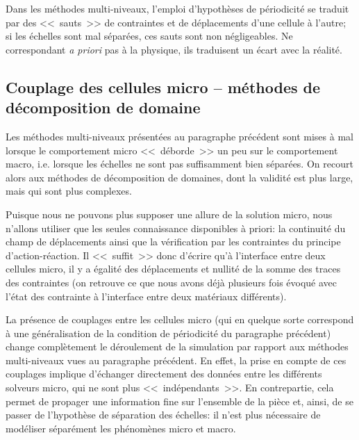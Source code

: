 Dans les méthodes multi-niveaux, l'emploi d'hypothèses de périodicité se traduit par
des <<~sauts~>> de contraintes et de déplacements d'une cellule à l'autre; si les échelles sont
mal séparées, ces sauts sont non négligeables. Ne correspondant \emph{a priori} pas à la physique,
ils traduisent un écart avec la réalité.



\medskip
\subsection{Couplage des cellules micro -- méthodes de décomposition de domaine}\label{Sec-dec}

Les méthodes multi-niveaux présentées au paragraphe précédent sont mises à mal
lorsque le comportement micro <<~déborde~>> un peu sur le comportement macro, i.e.
lorsque les échelles ne sont pas suffisamment bien séparées.
On recourt alors aux méthodes de décomposition de domaines,
dont la validité est plus large, mais qui sont plus complexes.

\medskip
Puisque nous ne pouvons plus supposer une allure de la solution micro,
nous n'allons utiliser que les seules connaissance disponibles à priori: la continuité du champ de déplacements
ainsi que la vérification par les contraintes du principe d'action-réaction. Il <<~suffit~>> donc
d'écrire qu'à l'interface entre deux cellules micro, il y a égalité des déplacements et
nullité de la somme des traces des contraintes (on retrouve ce que nous avons déjà
plusieurs fois évoqué avec l'état des contrainte à l'interface entre deux matériaux
différents).

\medskip
La présence de couplages entre les cellules micro
(qui en quelque sorte correspond à une généralisation de la condition de périodicité
du paragraphe précédent) change complètement le déroulement de la simulation par
rapport aux méthodes multi-niveaux vues au paragraphe précédent.
En effet, la prise en compte de ces couplages implique d'échanger directement des données
entre les différents solveurs micro, qui ne sont plus <<~indépendants~>>.
En contrepartie, cela permet de propager une information fine sur l'ensemble de la pièce et,
ainsi, de se passer de l'hypothèse de séparation des échelles: il n'est plus nécessaire de
modéliser séparément les phénomènes micro et macro.

